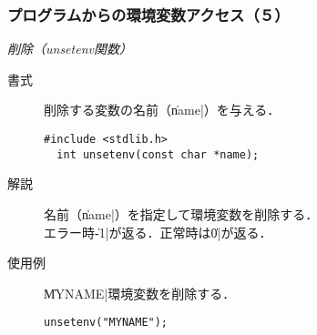 \documentclass{beamer}                 %
\begin{document}
\begin{frame}[fragile]
  \frametitle{プログラムからの環境変数アクセス（５）}
  \emph{削除（unsetenv関数）}
  \begin{description}
  \item [書式] 削除する変数の名前（\|name|）を与える．
\begin{lstlisting}[numbers=none]
  #include <stdlib.h>
  int unsetenv(const char *name);
\end{lstlisting}
  \item [解説] 名前（\|name|）を指定して環境変数を削除する．\\
    エラー時\|-1|が返る．正常時は\|0|が返る．
  \item [使用例] \|MYNAME|環境変数を削除する．
\begin{lstlisting}[numbers=none]
  unsetenv("MYNAME");
\end{lstlisting}
  \end{description}
  \vfill
\end{frame}
\end{document}
